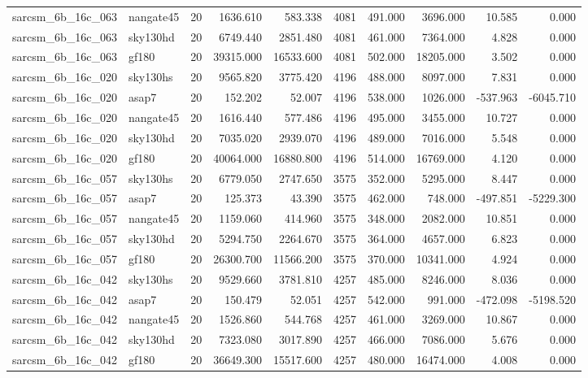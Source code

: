 \begin{tabular}{llrrrrrrrr}
sarcsm\_6b\_16c\_063 & nangate45 & 20 & 1636.610 & 583.338 & 4081 & 491.000 & 3696.000 & 10.585 & 0.000 \\
sarcsm\_6b\_16c\_063 & sky130hd & 20 & 6749.440 & 2851.480 & 4081 & 461.000 & 7364.000 & 4.828 & 0.000 \\
sarcsm\_6b\_16c\_063 & gf180 & 20 & 39315.000 & 16533.600 & 4081 & 502.000 & 18205.000 & 3.502 & 0.000 \\
sarcsm\_6b\_16c\_020 & sky130hs & 20 & 9565.820 & 3775.420 & 4196 & 488.000 & 8097.000 & 7.831 & 0.000 \\
sarcsm\_6b\_16c\_020 & asap7 & 20 & 152.202 & 52.007 & 4196 & 538.000 & 1026.000 & -537.963 & -6045.710 \\
sarcsm\_6b\_16c\_020 & nangate45 & 20 & 1616.440 & 577.486 & 4196 & 495.000 & 3455.000 & 10.727 & 0.000 \\
sarcsm\_6b\_16c\_020 & sky130hd & 20 & 7035.020 & 2939.070 & 4196 & 489.000 & 7016.000 & 5.548 & 0.000 \\
sarcsm\_6b\_16c\_020 & gf180 & 20 & 40064.000 & 16880.800 & 4196 & 514.000 & 16769.000 & 4.120 & 0.000 \\
sarcsm\_6b\_16c\_057 & sky130hs & 20 & 6779.050 & 2747.650 & 3575 & 352.000 & 5295.000 & 8.447 & 0.000 \\
sarcsm\_6b\_16c\_057 & asap7 & 20 & 125.373 & 43.390 & 3575 & 462.000 & 748.000 & -497.851 & -5229.300 \\
sarcsm\_6b\_16c\_057 & nangate45 & 20 & 1159.060 & 414.960 & 3575 & 348.000 & 2082.000 & 10.851 & 0.000 \\
sarcsm\_6b\_16c\_057 & sky130hd & 20 & 5294.750 & 2264.670 & 3575 & 364.000 & 4657.000 & 6.823 & 0.000 \\
sarcsm\_6b\_16c\_057 & gf180 & 20 & 26300.700 & 11566.200 & 3575 & 370.000 & 10341.000 & 4.924 & 0.000 \\
sarcsm\_6b\_16c\_042 & sky130hs & 20 & 9529.660 & 3781.810 & 4257 & 485.000 & 8246.000 & 8.036 & 0.000 \\
sarcsm\_6b\_16c\_042 & asap7 & 20 & 150.479 & 52.051 & 4257 & 542.000 & 991.000 & -472.098 & -5198.520 \\
sarcsm\_6b\_16c\_042 & nangate45 & 20 & 1526.860 & 544.768 & 4257 & 461.000 & 3269.000 & 10.867 & 0.000 \\
sarcsm\_6b\_16c\_042 & sky130hd & 20 & 7323.080 & 3017.890 & 4257 & 466.000 & 7086.000 & 5.676 & 0.000 \\
sarcsm\_6b\_16c\_042 & gf180 & 20 & 36649.300 & 15517.600 & 4257 & 480.000 & 16474.000 & 4.008 & 0.000 \\

\end{tabular}
